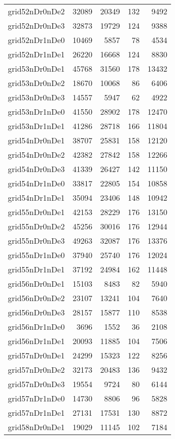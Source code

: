 \begin{longtable}{lrrrr}
grid52nDr0nDe2 & 32089 & 20349 & 132 & 9492 \\
grid52nDr0nDe3 & 32873 & 19729 & 124 & 9388 \\
grid52nDr1nDe0 & 10469 & 5857 & 78 & 4534 \\
grid52nDr1nDe1 & 26220 & 16668 & 124 & 8830 \\
grid53nDr0nDe1 & 45768 & 31560 & 178 & 13432 \\
grid53nDr0nDe2 & 18670 & 10068 & 86 & 6406 \\
grid53nDr0nDe3 & 14557 & 5947 & 62 & 4922 \\
grid53nDr1nDe0 & 41550 & 28902 & 178 & 12470 \\
grid53nDr1nDe1 & 41286 & 28718 & 166 & 11804 \\
grid54nDr0nDe1 & 38707 & 25831 & 158 & 12120 \\
grid54nDr0nDe2 & 42382 & 27842 & 158 & 12266 \\
grid54nDr0nDe3 & 41339 & 26427 & 142 & 11150 \\
grid54nDr1nDe0 & 33817 & 22805 & 154 & 10858 \\
grid54nDr1nDe1 & 35094 & 23406 & 148 & 10942 \\
grid55nDr0nDe1 & 42153 & 28229 & 176 & 13150 \\
grid55nDr0nDe2 & 45256 & 30016 & 176 & 12944 \\
grid55nDr0nDe3 & 49263 & 32087 & 176 & 13376 \\
grid55nDr1nDe0 & 37940 & 25740 & 176 & 12024 \\
grid55nDr1nDe1 & 37192 & 24984 & 162 & 11448 \\
grid56nDr0nDe1 & 15103 & 8483 & 82 & 5940 \\
grid56nDr0nDe2 & 23107 & 13241 & 104 & 7640 \\
grid56nDr0nDe3 & 28157 & 15877 & 110 & 8538 \\
grid56nDr1nDe0 & 3696 & 1552 & 36 & 2108 \\
grid56nDr1nDe1 & 20093 & 11885 & 104 & 7506 \\
grid57nDr0nDe1 & 24299 & 15323 & 122 & 8256 \\
grid57nDr0nDe2 & 32173 & 20483 & 136 & 9432 \\
grid57nDr0nDe3 & 19554 & 9724 & 80 & 6144 \\
grid57nDr1nDe0 & 14730 & 8806 & 96 & 5828 \\
grid57nDr1nDe1 & 27131 & 17531 & 130 & 8872 \\
grid58nDr0nDe1 & 19029 & 11145 & 102 & 7184 \\

\end{longtable}
